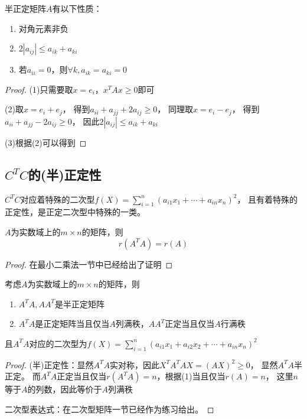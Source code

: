 \begin{theorem}[半正定矩阵对角性质]
  半正定矩阵$A$有以下性质：
  \begin{enumerate}
  \item 对角元素非负
  \item $2|a_{ij}| \leq a_{ik} + a_{ki}$
  \item 若$a_{ii} = 0$，则$\forall k, a_{ik} = a_{ki} = 0$
  \end{enumerate}
\end{theorem}

\begin{proof}
  (1)只需要取$x = e_i$，$x^TAx \geq 0$即可

  (2)取$x = e_i + e_j$，
  得到$a_{ii} + a_{jj} + 2a_{ij} \geq 0$，
  同理取$x = e_i - e_j$，
  得到$a_{ii} + a_{jj} - 2a_{ij} \geq 0$，
  因此$2|a_{ij}| \leq a_{ik} + a_{ki}$

  (3)根据(2)可以得到
\end{proof}


\subsection{$C^TC$的(半)正定性}

$C^TC$对应着特殊的二次型$f(X) = \sum\limits_{i = 1}^n(a_{i1}x_1 + \cdots + a_{in}x_n)^2$，
且有着特殊的正定性，是正定二次型中特殊的一类。

\begin{lemma}[$r(A^TA)$与$r(A)$]
  $A$为实数域上的$m \times n$的矩阵，则
  \begin{equation*}
    r(A^TA) = r(A)
  \end{equation*}
\end{lemma}

\begin{proof}
  在最小二乘法一节中已经给出了证明
\end{proof}

\begin{theorem}[$A^TA$的正定性]
  考虑$A$为实数域上的$m \times n$的矩阵，则
  \begin{enumerate}
  \item $A^TA, AA^T$是半正定矩阵
  \item 
    $A^TA$是正定矩阵当且仅当$A$列满秩，$AA^T$正定当且仅当$A$行满秩
  \end{enumerate}
  且$A^TA$对应的二次型为$f(X) = \sum\limits_{i = 1}^n (a_{i1}x_1 + a_{i2}x_2 + \cdots + a_{in}x_n)^2$
\end{theorem}

\begin{proof}
  (半)正定性：显然$A^TA$实对称，因此$X^TA^TAX = (AX)^2 \geq 0$，
  显然$A^TA$半正定。
  而$A^TA$正定当且仅当$r(A^TA) = n$，根据(1)当且仅当$r(A) = n$，
  这里$n$等于$A$的列数，因此等价于$A$列满秩

  二次型表达式：在二次型矩阵一节已经作为练习给出。
\end{proof}


